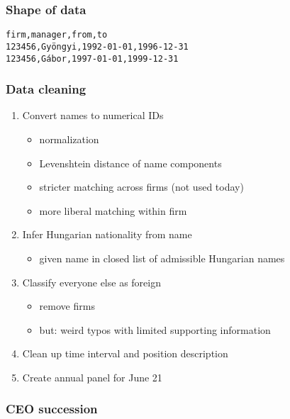 \documentclass[aspectratio=169,compress,mathserif]{beamer}
\newcommand{\scaffolding}{\draw [->] (0,-0.5) --(14,-0.5);
\draw[thick] (7,-0.5)--(10,-0.5);

\foreach \x in {1,4,7,10,13}
\draw(\x cm,3pt - 0.5cm) -- (\x cm, -3pt - 0.5cm);
}
\begin{document}
\begin{frame}\frametitle{Shape of data}\hypertarget{Shape of data}{}
\texttt{firm,manager,from,to\\
123456,Gyöngyi,1992-01-01,1996-12-31\\
123456,Gábor,1997-01-01,1999-12-31}


\end{frame}



\begin{frame}\frametitle{Data cleaning}\hypertarget{Data cleaning}{}
\begin{enumerate}\setcounter{enumi}{0}
\item Convert names to numerical IDs
\begin{itemize}
\item normalization

\item Levenshtein distance of name components

\item stricter matching across firms (not used today)

\item more liberal matching within firm
\end{itemize}

\item Infer Hungarian nationality from name
\begin{itemize}
\item given name in closed list of admissible Hungarian names
\end{itemize}

\item Classify everyone else as foreign
\begin{itemize}
\item remove firms

\item but: weird typos with limited supporting information
\end{itemize}

\item Clean up time interval and position description

\item Create annual panel for June 21


\end{enumerate}
\end{frame}



\begin{frame}\frametitle{CEO succession}\hypertarget{CEO succession}{}


\end{frame}
\end{document}
